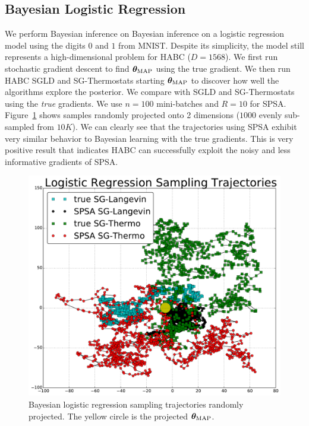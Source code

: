 \documentclass[]{article}
\begin{document}
\subsection{Bayesian Logistic Regression}\label{sec:auto}
We perform Bayesian inference on Bayesian inference on a logistic regression model using the digits $0$ and $1$ from MNIST.  Despite its simplicity, the model still represents a high-dimensional problem for HABC ($D=1568$).  We first run stochastic gradient descent to find ${\bm \theta}_{\text{MAP}}$ using the true gradient.  We then run HABC SGLD and SG-Thermostats starting  ${\bm \theta}_{\text{MAP}}$ to discover how well the algorithms explore the posterior.  We compare with SGLD and SG-Thermostats using the {\em true} gradients.   
%
We use $n=100$ mini-batches and $R=10$ for SPSA.  Figure~\ref{fig:blr} shows samples randomly projected onto 2 dimensions ($1000$ evenly sub-sampled from $10K$).  We can clearly see that the trajectories using SPSA exhibit very similar behavior to Bayesian learning with the true gradients.  This is very positive result that indicates HABC can successfully exploit the noisy and less informative gradients of SPSA.
\begin{figure}[t]
\begin{center}
\includegraphics[width=0.9\columnwidth]{./images/lr/lr_trajectories.pdf}
\vspace{-0.15in}
\caption{\small{Bayesian logistic regression sampling trajectories randomly projected.  The yellow circle is the projected ${\bm \theta}_{\text{MAP}}$.}  
}
\label{fig:blr}
\end{center}
\vskip -0.2in
\end{figure}
\end{document}

